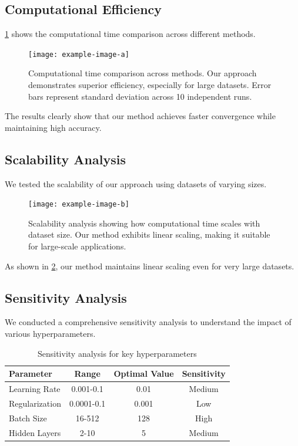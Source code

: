 \documentclass[12pt, letterpaper, onecolumn, final]{article}
\theoremstyle{plain}
\theoremstyle{definition}
\theoremstyle{remark}
\begin{document}
\lipsum[37]

\subsection{Computational Efficiency}
\label{sec:efficiency}

\cref{fig:efficiency} shows the computational time comparison across different methods.

\begin{figure}[htbp]
    \centering
    \texttt{[image: example-image-a]}
    \caption{Computational time comparison across methods. Our approach demonstrates superior efficiency, especially for large datasets. Error bars represent standard deviation across 10 independent runs.}
    \label{fig:efficiency}
\end{figure}

\lipsum[38] The results clearly show that our method achieves faster convergence while maintaining high accuracy.

\subsection{Scalability Analysis}
\label{sec:scalability}

\lipsum[39-40] We tested the scalability of our approach using datasets of varying sizes.

\begin{figure}[htbp]
    \centering
    \texttt{[image: example-image-b]}
    \caption{Scalability analysis showing how computational time scales with dataset size. Our method exhibits linear scaling, making it suitable for large-scale applications.}
    \label{fig:scalability}
\end{figure}

As shown in \cref{fig:scalability}, our method maintains linear scaling even for very large datasets.

\subsection{Sensitivity Analysis}
\label{sec:sensitivity}

\lipsum[41] We conducted a comprehensive sensitivity analysis to understand the impact of various hyperparameters.

\begin{table}[htbp]
    \centering
    \caption{Sensitivity analysis for key hyperparameters}
    \label{tab:sensitivity}
    \begin{tabular}{lccc}
        \toprule
        Parameter & Range & Optimal Value & Sensitivity \\
        \midrule
        Learning Rate & 0.001-0.1 & 0.01 & Medium \\
        Regularization & 0.0001-0.1 & 0.001 & Low \\
        Batch Size & 16-512 & 128 & High \\
        Hidden Layers & 2-10 & 5 & Medium \\
        \bottomrule
    \end{tabular}
\end{table}
\end{document}
